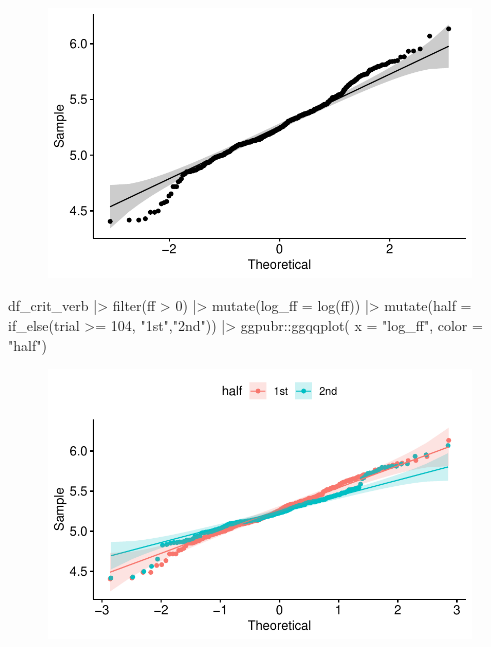 \documentclass[
  letterpaper,
  DIV=11,
  numbers=noendperiod]{scrartcl}
\newenvironment{Shaded}{\begin{snugshade}}{\end{snugshade}}
\newcommand{\AttributeTok}[1]{\textcolor[rgb]{0.40,0.45,0.13}{#1}}
\newcommand{\DecValTok}[1]{\textcolor[rgb]{0.68,0.00,0.00}{#1}}
\newcommand{\FunctionTok}[1]{\textcolor[rgb]{0.28,0.35,0.67}{#1}}
\newcommand{\NormalTok}[1]{\textcolor[rgb]{0.00,0.23,0.31}{#1}}
\newcommand{\SpecialCharTok}[1]{\textcolor[rgb]{0.37,0.37,0.37}{#1}}
\newcommand{\StringTok}[1]{\textcolor[rgb]{0.13,0.47,0.30}{#1}}
\begin{document}
\begin{figure}[H]

{\centering \includegraphics{_lin_reg1_files/figure-pdf/unnamed-chunk-37-1.pdf}

}

\end{figure}

\begin{Shaded}
\begin{Highlighting}[]
\NormalTok{df\_crit\_verb }\SpecialCharTok{|\textgreater{}} 
  \FunctionTok{filter}\NormalTok{(ff }\SpecialCharTok{\textgreater{}} \DecValTok{0}\NormalTok{) }\SpecialCharTok{|\textgreater{}} 
  \FunctionTok{mutate}\NormalTok{(}\AttributeTok{log\_ff =} \FunctionTok{log}\NormalTok{(ff)) }\SpecialCharTok{|\textgreater{}} 
  \FunctionTok{mutate}\NormalTok{(}\AttributeTok{half =} \FunctionTok{if\_else}\NormalTok{(trial }\SpecialCharTok{\textgreater{}=} \DecValTok{104}\NormalTok{, }\StringTok{"1st"}\NormalTok{,}\StringTok{"2nd"}\NormalTok{)) }\SpecialCharTok{|\textgreater{}} 
\NormalTok{  ggpubr}\SpecialCharTok{::}\FunctionTok{ggqqplot}\NormalTok{( }\AttributeTok{x =} \StringTok{"log\_ff"}\NormalTok{,}
                    \AttributeTok{color =} \StringTok{"half"}\NormalTok{)}
\end{Highlighting}
\end{Shaded}

\begin{figure}[H]

{\centering \includegraphics{_lin_reg1_files/figure-pdf/unnamed-chunk-38-1.pdf}

}

\end{figure}
\end{document}
